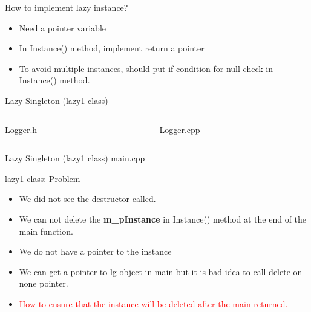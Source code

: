 \documentclass[13pt]{beamer}
\begin{document}
\begin{frame}{How to implement lazy instance?}
\begin{itemize}
\setlength\itemsep{2em}

\item Need a pointer variable

\item In Instance() method, implement return a pointer

\item To avoid multiple instances, should put if condition for null check in Instance() method.

\end{itemize}
\end{frame}

\begin{frame}{Lazy Singleton (lazy1 class)}
\begin{columns}[T]
\begin{column}{.45\textwidth}
Logger.h
\lstset{basicstyle=\tiny,style=myCustomCppStyle}

\end{column}

\begin{column}{.45\textwidth}
Logger.cpp
\lstset{basicstyle=\tiny,style=myCustomCppStyle}

\end{column}
\end{columns}
\end{frame}

\begin{frame}{Lazy Singleton (lazy1 class)}
main.cpp
\lstset{basicstyle=\tiny,style=myCustomCppStyle}

\end{frame}

\begin{frame}{lazy1 class: Problem}
\begin{itemize}
\setlength\itemsep{1em}

\item We did not see the destructor called.

\item We can not delete the \textbf{m\_pInstance} in Instance() method at the end of the main function.

\item We do not have a pointer to the instance

\item We can get a pointer to lg object in main but it is bad idea to call delete on none pointer.

\item \textcolor{red}{How to ensure that the instance will be deleted after the main returned.}
\end{itemize}
\end{frame}
\end{document}
